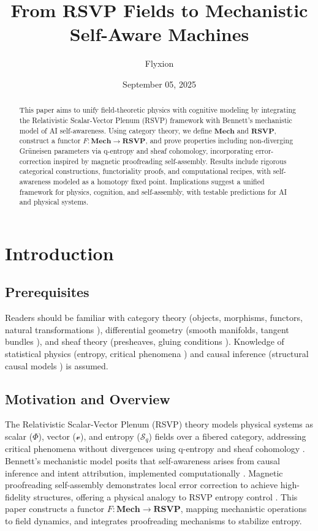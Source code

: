 \documentclass{article}
\title{From RSVP Fields to Mechanistic Self-Aware Machines}
\author{Flyxion}
\date{September 05, 2025}
\theoremstyle{plain}
\theoremstyle{definition}
\begin{document}
\maketitle

\begin{abstract}
This paper aims to unify field-theoretic physics with cognitive modeling by integrating the Relativistic Scalar-Vector Plenum (RSVP) framework with Bennett’s mechanistic model of AI self-awareness. Using category theory, we define $\mathbf{Mech}$ and $\mathbf{RSVP}$, construct a functor $F: \mathbf{Mech} \to \mathbf{RSVP}$, and prove properties including non-diverging Gr\"uneisen parameters via q-entropy and sheaf cohomology, incorporating error-correction inspired by magnetic proofreading self-assembly. Results include rigorous categorical constructions, functoriality proofs, and computational recipes, with self-awareness modeled as a homotopy fixed point. Implications suggest a unified framework for physics, cognition, and self-assembly, with testable predictions for AI and physical systems.
\end{abstract}

\section{Introduction}

\subsection{Prerequisites}
Readers should be familiar with category theory (objects, morphisms, functors, natural transformations \cite{Awodey2010,Lawvere2009}), differential geometry (smooth manifolds, tangent bundles \cite{Kock2004}), and sheaf theory (presheaves, gluing conditions \cite{MacLane1992,Bredon1997}). Knowledge of statistical physics (entropy, critical phenomena \cite{Tsallis1988}) and causal inference (structural causal models \cite{Pearl2009}) is assumed.

\subsection{Motivation and Overview}
The Relativistic Scalar-Vector Plenum (RSVP) theory models physical systems as scalar ($\Phi$), vector ($\mathcal{v}$), and entropy ($\mathcal{S}_q$) fields over a fibered category, addressing critical phenomena without divergences using q-entropy and sheaf cohomology \cite{Soares2024,Tsallis1988,Soares2023prb,Soares2023physica}. Bennett’s mechanistic model posits that self-awareness arises from causal inference and intent attribution, implemented computationally \cite{Bennett2025}. Magnetic proofreading self-assembly demonstrates local error correction to achieve high-fidelity structures, offering a physical analogy to RSVP entropy control \cite{Liang2025}. This paper constructs a functor $F: \mathbf{Mech} \to \mathbf{RSVP}$, mapping mechanistic operations to field dynamics, and integrates proofreading mechanisms to stabilize entropy.
\end{document}
